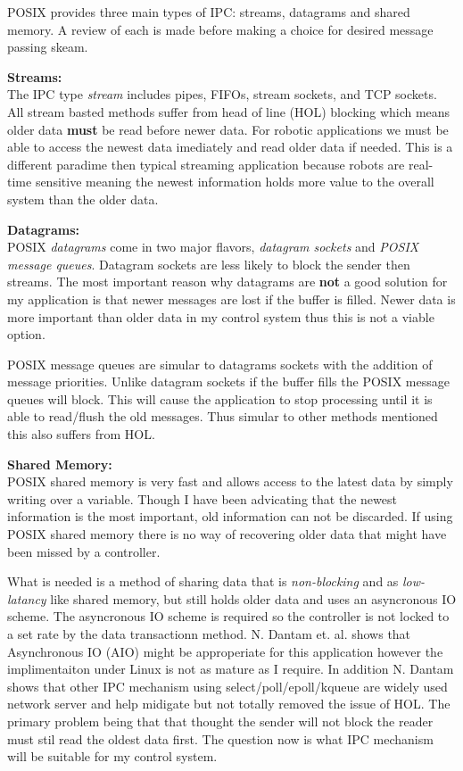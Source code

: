 POSIX provides three main types of IPC: streams, datagrams and shared memory.  
A review of each is made before making a choice for desired message passing skeam.

\noindent \textbf{Streams:}\\
The IPC type \textit{stream} includes pipes, FIFOs, stream sockets, and TCP sockets.
All stream basted methods suffer from head of line (HOL) blocking which means older data \textbf{must} be read before newer data.
For robotic applications we must be able to access the newest data imediately and read older data if needed.
This is a different paradime then typical streaming application because robots are real-time sensitive meaning the newest information holds more value to the overall system than the older data.

\noindent \textbf{Datagrams:}\\
POSIX \textit{datagrams} come in two major flavors, \textit{datagram sockets} and \textit{POSIX message queues}.
Datagram sockets are less likely to block the sender then streams.
The most important reason why datagrams are \textbf{not} a good solution for my application is that newer messages are lost if the buffer is filled.
Newer data is more important than older data in my control system thus this is not a viable option.

POSIX message queues are simular to datagrams sockets with the addition of message priorities.
Unlike datagram sockets if the buffer fills the POSIX message queues will block.
This will cause the application to stop processing until it is able to read/flush the old messages.
Thus simular to other methods mentioned this also suffers from HOL.

\noindent \textbf{Shared Memory:}\\
POSIX shared memory is very fast and allows access to the latest data by simply writing over a variable.
Though I have been advicating that the newest information is the most important, old information can not be discarded.
If using POSIX shared memory there is no way of recovering older data that might have been missed by a controller.

What is needed is a method of sharing data that is \textit{non-blocking} and as \textit{low-latancy} like shared memory, but still holds older data and uses an asyncronous IO scheme.
The asyncronous IO scheme is required so the controller is not locked to a set rate by the data transactionn method.
N. Dantam et. al.\cite{ach} shows that Asynchronous IO (AIO) might be approperiate for this application however the implimentaiton under Linux is not as mature as I require.
In addition N. Dantam shows that other IPC mechanism using select/poll/epoll/kqueue are widely used network server and help midigate but not totally removed the issue of HOL.
The primary problem being that that thought the sender will not block the reader must stil read the oldest data first.
The question now is what IPC mechanism will be suitable for my control system.

